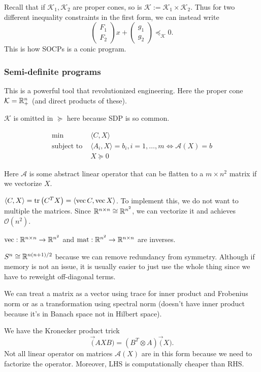 \documentclass[class=article,crop=false]{standalone}
\begin{document}
Recall that if $ \mathcal{ K}_1, \mathcal{ K}_2$ are proper cones, so is $ \mathcal{ K} := \mathcal{ K}_1 \times \mathcal{ K}_2$. Thus for two different inequality constraints in the first form, we can instead write
\[
\begin{pmatrix} F_1\\F_2 \end{pmatrix} x + \begin{pmatrix} g_1\\g_2 \end{pmatrix} \preceq_{ \mathcal{ K}} 0
.\] 
This is how SOCPs is a conic program.
\subsubsection{Semi-definite programs}
This is a powerful tool that revolutionized engineering. Here the proper cone $ \mathcal{ K} = \mathbb{R}_{+}^{n}$ (and direct products of these).
\begin{notation}
	$ \mathcal{ K}$ is omitted in $ \succeq$ here because SDP is so common.
\end{notation}
\begin{align*}
	\min\ & \langle C,X \rangle \\
	\text{subject to } & \langle A_i,X \rangle =b_i, i = 1,\ldots,m \iff \mathcal{ A}(X) = b\\
&X \succeq 0 
\end{align*}
\begin{note}
Here $ \mathcal{ A}$ is some abstract linear operator that can be flatten to a $ m \times n^2$ matrix if we vectorize $ X$.
\end{note}
\begin{remark}
	$ \langle C,X \rangle = \operatorname{tr}\left( C^{T} X \right) = \langle \operatorname{vec}{C},\operatorname{vec}{X} \rangle$. To implement this, we do not want to multiple the matrices. Since $ \mathbb{R}^{ n \times n} \cong \mathbb{R}^{n^2}$, we can vectorize it and achieves $ \mathcal{ O}(n^2)$. 
\end{remark}
\begin{remark}
$ \operatorname{vec}: \mathbb{R}^{ n \times n} \to \mathbb{R}^{n^2}$ and $ \operatorname{mat} : \mathbb{R}^{n^2} \to \mathbb{R}^{n \times n}$ are inverses.

$ S^{n} \cong \mathbb{R}^{ n(n+1) /2}$ because we can remove redundancy from symmetry. Although if memory is not an issue, it is usually easier to just use the whole thing since we have to reweight off-diagonal terms.
\end{remark}

\begin{remark}
	We can treat a matrix as a vector using trace for inner product and Frobenius norm or as a transformation using spectral norm (doesn't have inner product because it's in Banach space not in Hilbert space). 
\end{remark}

\begin{remark}
We have the Kronecker product trick
\[
	\vec(A X B) = \left( B^{T} \otimes A \right) \vec(X)
.\] 
Not all linear operator on matrices $ \mathcal{ A}(X)$ are in this form because we need to factorize the operator. Moreover, LHS is computationally cheaper than RHS.
\end{remark}
\end{document}
